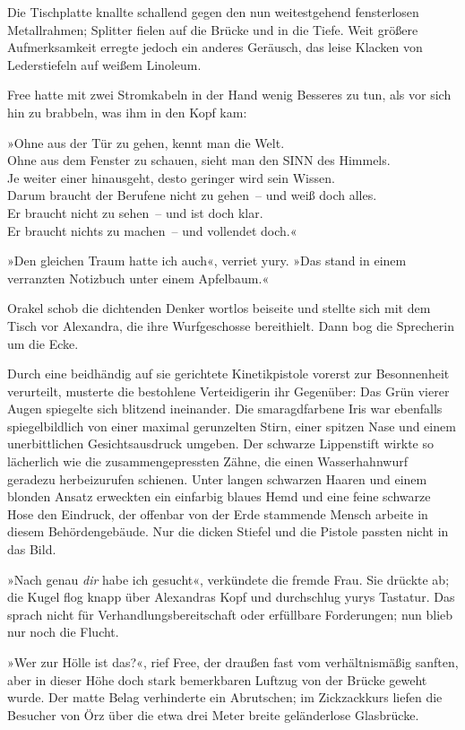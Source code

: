 Die Tischplatte knallte schallend gegen den nun weitestgehend fensterlosen Metallrahmen; Splitter fielen auf die Brücke und in die Tiefe. Weit größere Aufmerksamkeit erregte jedoch ein anderes Geräusch, das leise Klacken von Lederstiefeln auf weißem Linoleum.

Free hatte mit zwei Stromkabeln in der Hand wenig Besseres zu tun, als vor sich hin zu brabbeln, was ihm in den Kopf kam:

\noindent »Ohne aus der Tür zu gehen, kennt man die Welt.\\
Ohne aus dem Fenster zu schauen, sieht man den SINN des Himmels.\\
Je weiter einer hinausgeht, desto geringer wird sein Wissen.\\
Darum braucht der Berufene nicht zu gehen~– und weiß doch alles.\\
Er braucht nicht zu sehen~– und ist doch klar.\\
Er braucht nichts zu machen~– und vollendet doch.«

»Den gleichen Traum hatte ich auch«, verriet yury. »Das stand in einem verranzten Notizbuch unter einem Apfelbaum.«

Orakel schob die dichtenden Denker wortlos beiseite und stellte sich mit dem Tisch vor Alexandra, die ihre Wurfgeschosse bereithielt. Dann bog die Sprecherin um die Ecke.

Durch eine beidhändig auf sie gerichtete Kinetikpistole vorerst zur Besonnenheit verurteilt, musterte die bestohlene Verteidigerin ihr Gegenüber: Das Grün vierer Augen spiegelte sich blitzend ineinander. Die smaragdfarbene Iris war ebenfalls spiegelbildlich von einer maximal gerunzelten Stirn, einer spitzen Nase und einem unerbittlichen Gesichtsausdruck umgeben. Der schwarze Lippenstift wirkte so lächerlich wie die zusammengepressten Zähne, die einen Wasserhahnwurf geradezu herbeizurufen schienen. Unter langen schwarzen Haaren und einem blonden Ansatz erweckten ein einfarbig blaues Hemd und eine feine schwarze Hose den Eindruck, der offenbar von der Erde stammende Mensch arbeite in diesem Behördengebäude. Nur die dicken Stiefel und die Pistole passten nicht in das Bild.

»Nach genau \emph{dir} habe ich gesucht«, verkündete die fremde Frau. Sie drückte ab; die Kugel flog knapp über Alexandras Kopf und durchschlug yurys Tastatur. Das sprach nicht für Verhandlungsbereitschaft oder erfüllbare Forderungen; nun blieb nur noch die Flucht.

»Wer zur Hölle ist das?«, rief Free, der draußen fast vom verhältnismäßig sanften, aber in dieser Höhe doch stark bemerkbaren Luftzug von der Brücke geweht wurde. Der matte Belag verhinderte ein Abrutschen; im Zickzackkurs liefen die Besucher von Örz über die etwa drei Meter breite geländerlose Glasbrücke.

